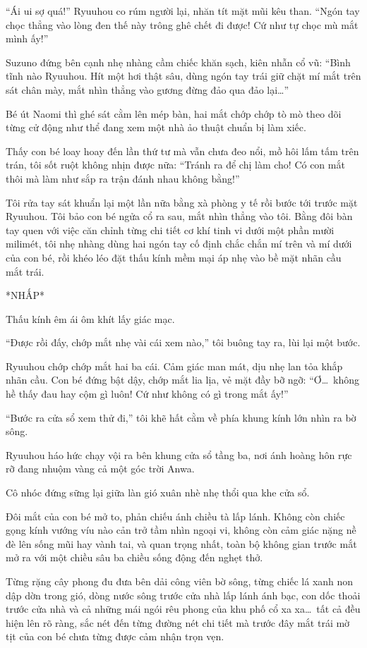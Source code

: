 ﻿\documentclass[../main.tex]{subfiles}
\begin{document}
``Ái ui sợ quá!'' Ryuuhou co rúm người lại, nhăn tít mặt mũi kêu than. ``Ngón tay chọc thẳng vào lòng đen thế này trông ghê chết đi được! Cứ như tự chọc mù mắt mình ấy!''

Suzuno đứng bên cạnh nhẹ nhàng cầm chiếc khăn sạch, kiên nhẫn cổ vũ: ``Bình tĩnh nào Ryuuhou. Hít một hơi thật sâu, dùng ngón tay trái giữ chặt mí mắt trên sát chân mày, mắt nhìn thẳng vào gương đừng đảo qua đảo lại\dots''

Bé út Naomi thì ghé sát cằm lên mép bàn, hai mắt chớp chớp tò mò theo dõi từng cử động như thể đang xem một nhà ảo thuật chuẩn bị làm xiếc.

Thấy con bé loay hoay đến lần thứ tư mà vẫn chưa đeo nổi, mồ hôi lấm tấm trên trán, tôi sốt ruột không nhịn được nữa: ``Tránh ra để chị làm cho! Có con mắt thôi mà làm như sắp ra trận đánh nhau không bằng!''

Tôi rửa tay sát khuẩn lại một lần nữa bằng xà phòng y tế rồi bước tới trước mặt Ryuuhou. Tôi bảo con bé ngửa cổ ra sau, mắt nhìn thẳng vào tôi. Bằng đôi bàn tay quen với việc căn chỉnh từng chi tiết cơ khí tinh vi dưới một phần mười milimét, tôi nhẹ nhàng dùng hai ngón tay cố định chắc chắn mí trên và mí dưới của con bé, rồi khéo léo đặt thấu kính mềm mại áp nhẹ vào bề mặt nhãn cầu mắt trái.

*NHẤP*

Thấu kính êm ái ôm khít lấy giác mạc.

``Được rồi đấy, chớp mắt nhẹ vài cái xem nào,'' tôi buông tay ra, lùi lại một bước.

Ryuuhou chớp chớp mắt hai ba cái. Cảm giác man mát, dịu nhẹ lan tỏa khắp nhãn cầu. Con bé đứng bật dậy, chớp mắt lia lịa, vẻ mặt đầy bỡ ngỡ: ``Ơ\dots\ không hề thấy đau hay cộm gì luôn! Cứ như không có gì trong mắt ấy!''

``Bước ra cửa sổ xem thử đi,'' tôi khẽ hất cằm về phía khung kính lớn nhìn ra bờ sông.

Ryuuhou háo hức chạy vội ra bên khung cửa sổ tầng ba, nơi ánh hoàng hôn rực rỡ đang nhuộm vàng cả một góc trời Anwa.

Cô nhóc đứng sững lại giữa làn gió xuân nhè nhẹ thổi qua khe cửa sổ.

Đôi mắt của con bé mở to, phản chiếu ánh chiều tà lấp lánh. Không còn chiếc gọng kính vướng víu nào cản trở tầm nhìn ngoại vi, không còn cảm giác nặng nề đè lên sống mũi hay vành tai, và quan trọng nhất, toàn bộ không gian trước mắt mở ra với một chiều sâu ba chiều sống động đến nghẹt thở.

Từng rặng cây phong đu đưa bên dải công viên bờ sông, từng chiếc lá xanh non dập dờn trong gió, dòng nước sông trước cửa nhà lấp lánh ánh bạc, con dốc thoải trước cửa nhà và cả những mái ngói rêu phong của khu phố cổ xa xa\dots\ tất cả đều hiện lên rõ ràng, sắc nét đến từng đường nét chi tiết mà trước đây mắt trái mờ tịt của con bé chưa từng được cảm nhận trọn vẹn.
\end{document}
